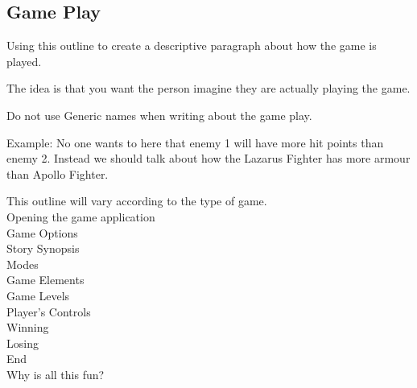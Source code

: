 \subsection{Game Play}

Using this outline to create a descriptive paragraph about how the game is played. 

The idea is that you want the person imagine they are actually playing the game.

Do not use Generic names when writing about the game play. 

Example: No one wants to here that enemy 1 will have more hit points than enemy 2. Instead we should talk about how the Lazarus Fighter has more armour than Apollo Fighter.

This outline will vary according to the type of game. \\
Opening the game application\\
Game Options \\
Story Synopsis\\
Modes\\
Game Elements\\
Game Levels\\
Player’s Controls\\
Winning\\
Losing\\
End\\
Why is all this fun?\\
\\





